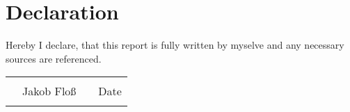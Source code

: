 \section*{Declaration}
\thispagestyle{empty}
Hereby I declare, that this report is fully written
by myselve and any necessary sources are referenced.

\begin{tabular}{@{}p{2.5in}p{2.5in}@{}}
 \\[5\bigskipamount]
  \dotfill & \dotfill \\
   \ \  Jakob Floß  & \ \ Date \\[5\bigskipamount]
  \centering
\end{tabular}

\clearpage